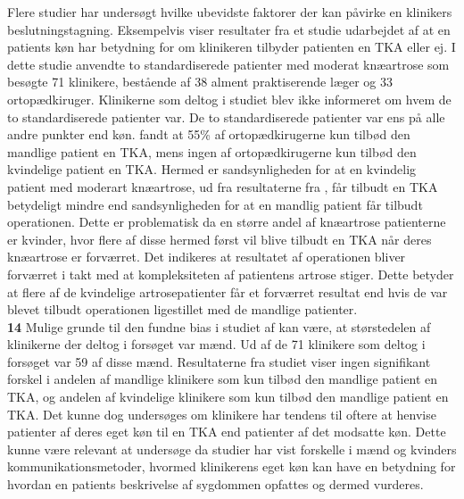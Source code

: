 Flere studier har undersøgt hvilke ubevidste faktorer der kan påvirke en klinikers beslutningstagning. Eksempelvis viser resultater fra et studie udarbejdet af \cite{borkhoff2008} at en patients køn har betydning for om klinikeren tilbyder patienten en TKA eller ej. I dette studie anvendte \cite{borkhoff2008} to standardiserede patienter med moderat knæartrose som besøgte 71 klinikere, bestående af 38 alment praktiserende læger og 33 ortopædkiruger. Klinikerne som deltog i studiet blev ikke informeret om hvem de to standardiserede patienter var. De to standardiserede patienter var ens på alle andre punkter end køn. \cite{borkhoff2008} fandt at 55\% af ortopædkirugerne  kun tilbød den mandlige patient en TKA, mens ingen af ortopædkirugerne  kun tilbød den kvindelige patient en TKA. Hermed er sandsynligheden for at en kvindelig patient med moderart knæartrose, ud fra resultaterne fra \cite{borkhoff2008}, får tilbudt en TKA betydeligt mindre end sandsynligheden for at en mandlig patient får tilbudt operationen. Dette er problematisk da en større andel af knæartrose patienterne er kvinder, hvor flere af disse hermed først vil blive tilbudt en TKA når deres knæartrose er forværret. Det indikeres at resultatet af operationen bliver forværret i takt med at kompleksiteten af patientens artrose stiger. \citep{fortin1999} Dette betyder at flere af de kvindelige artrosepatienter får et forværret resultat end hvis de var blevet tilbudt operationen ligestillet med de mandlige patienter. \citep{borkhoff2008} \\
\textbf{14} Mulige grunde til den fundne bias i studiet af \cite{borkhoff2008} kan være, at størstedelen af klinikerne der deltog i forsøget var mænd. Ud af de 71 klinikere som deltog i forsøget var 59 af disse mænd. Resultaterne fra studiet viser ingen signifikant forskel i andelen af mandlige klinikere som kun tilbød den mandlige patient en TKA, og andelen af kvindelige klinikere som kun tilbød den mandlige patient en TKA. Det kunne dog undersøges om klinikere har tendens til oftere at henvise patienter af deres eget køn til en TKA end patienter af det modsatte køn. Dette kunne være relevant at undersøge da studier har vist forskelle i mænd og kvinders kommunikationsmetoder, hvormed klinikerens eget køn kan have en betydning for hvordan en patients beskrivelse af sygdommen opfattes og dermed vurderes. \citep{street2002}   

